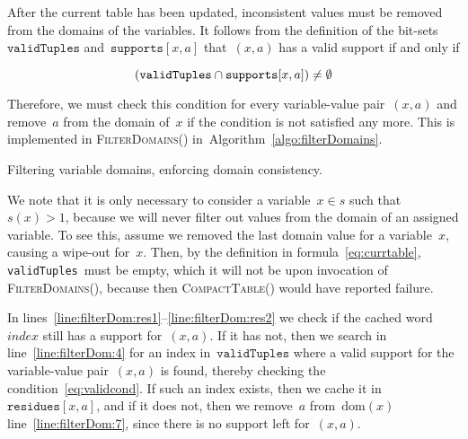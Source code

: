 \documentclass[a4paper,11pt]{article}
\newcommand{\Algoref}[1]{Algorithm~\ref{#1}}
\newcommand{\Lineref}[1]{Line~\ref{#1}}
\newcommand{\linesref}[2]{lines~\ref{#1}--\ref{#2}}
\newcommand{\Dom}[1]{\text{dom}({#1})}
\newcommand{\Scp}{\texttt{vars}}
\newcommand{\CurrTable}{\texttt{validTuples}}
\newcommand{\Supports}{\texttt{supports}}
\newcommand{\Residues}{\texttt{residues}}
\def\CompactTable{\textsc{CompactTable}}
\def\FilterDomains{\textsc{FilterDomains}}
\numberwithin{equation}{section}
\begin{document}
  After the current table has been updated, inconsistent values must be removed
  from the domains of the variables.   
  It follows from the definition of the bit-sets~$\CurrTable$ and~$\Supports[x,a]$
  that~$(x,a)$ has a valid support if and only if 

  \begin{equation}
    \label{eq:validcond}
    (\CurrTable \Inter \Supports[x,a]) \neq \emptyset
  \end{equation}

  Therefore, we must check this condition for every variable-value pair~$(x,a)$ and
  remove~$a$ from the domain of~$x$ if the condition is not satisfied any more.
  This is implemented in \FilterDomains()
  in~\Algoref{algo:filterDomains}.%

  \begin{algorithm}[H]
    \begin{algorithmic}[1]  %
      
    \end{algorithmic}
    \caption{Filtering variable domains, enforcing domain consistency.}
        \label{algo:filterDomains}
  \end{algorithm}

  
  We note that it is only necessary to
  consider a variable~$x \in s$ such that~$s(x) > 1$,
  because we will never filter out values from the domain of an assigned
  variable. To see this, assume we removed the last domain value for a variable~$x$,
  causing a wipe-out for~$x$. Then, by the definition in formula~\eqref{eq:currtable},
  \CurrTable~must be empty,
  which it will not be upon invocation of \FilterDomains(), because then
  \CompactTable() would have reported failure. 

  In \linesref{line:filterDom:res1}{line:filterDom:res2} we check if the
  cached word~$index$ still has a support for~$(x,a)$. If it has not,
  then we search in line~\ref{line:filterDom:4} for an index in~$\CurrTable$
  where a valid support for the variable-value pair~$(x,a)$ is found, 
  thereby checking the condition~\eqref{eq:validcond}.
  If such an index exists, then we cache it in~$\Residues[x,a]$, and
  if it does not, then we remove~$a$ from~$\Dom{x}$
  line~\ref{line:filterDom:7}, since there is no support left for~$(x,a)$.
\end{document}
